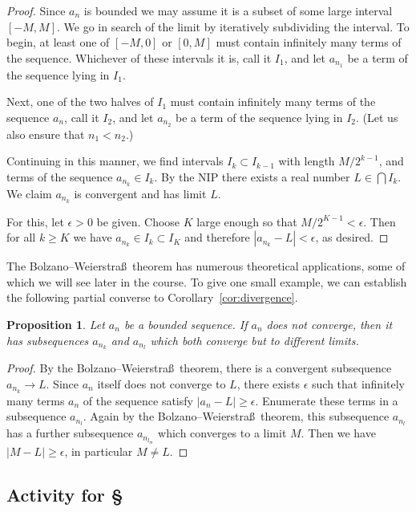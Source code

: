 \documentclass[11pt,oneside]{amsbook}
\theoremstyle{definition}
\theoremstyle{plain}
\newtheorem{proposition}[theorem]{Proposition}
\theoremstyle{definition}
\theoremstyle{remark}
\numberwithin{equation}{section}
\numberwithin{figure}{section}
\begin{document}
\begin{proof}
  Since $a_n$ is bounded we may assume it is a subset of some large interval $[-M,M]$. We go in search of the limit by iteratively subdividing the interval. To begin, at least one of $[-M,0]$ or $[0,M]$ must contain infinitely many terms of the sequence. Whichever of these intervals it is, call it $I_1$, and let $a_{n_1}$ be a term of the sequence lying in $I_1$.

  Next, one of the two halves of $I_1$ must contain infinitely many terms of the sequence $a_n$, call it $I_2$, and let $a_{n_2}$ be a term of the sequence lying in $I_2$. (Let us also ensure that $n_1<n_2$.)

  Continuing in this manner, we find intervals $I_k\subset I_{k-1}$ with length $M/2^{k-1}$, and terms of the sequence $a_{n_k}\in I_k$. By the NIP there exists a real number $L\in\bigcap I_k$. We claim $a_{n_k}$ is convergent and has limit $L$.

  For this, let $\epsilon>0$ be given. Choose $K$ large enough so that $M/2^{K-1}<\epsilon$. Then for all $k\geq K$ we have $a_{n_k}\in I_k\subset I_K$ and therefore $|a_{n_k}-L|<\epsilon$, as desired.
\end{proof}

The Bolzano--Weierstra\ss\ theorem has numerous theoretical applications, some of which we will see later in the course. To give one small example, we can establish the following partial converse to Corollary~\ref{cor:divergence}.

\begin{proposition}
  Let $a_n$ be a bounded sequence. If $a_n$ does not converge, then it has subsequences $a_{n_k}$ and $a_{n_l}$ which both converge but to different limits.
\end{proposition}

\begin{proof}
  By the Bolzano--Weierstra\ss\ theorem, there is a convergent subsequence $a_{n_k}\to L$. Since $a_n$ itself does not converge to $L$, there exists $\epsilon$ such that infinitely many terms $a_n$ of the sequence satisfy $|a_n-L|\geq\epsilon$. Enumerate these terms in a subsequence $a_{n_l}$. Again by the Bolzano--Weierstra\ss\ theorem, this subsequence $a_{n_l}$ has a further subsequence $a_{n_{l_m}}$ which converges to a limit $M$. Then we have $|M-L|\geq\epsilon$, in particular $M\neq L$.
\end{proof}

\newpage
\subsection*{Activity for \S \thesection}
\end{document}
